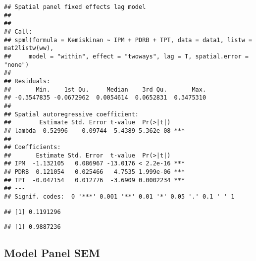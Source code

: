 \documentclass[
]{book}
\newenvironment{Shaded}{\begin{snugshade}}{\end{snugshade}}
\newcommand{\CommentTok}[1]{\textcolor[rgb]{0.56,0.35,0.01}{\textit{#1}}}
\newcommand{\DecValTok}[1]{\textcolor[rgb]{0.00,0.00,0.81}{#1}}
\newcommand{\DocumentationTok}[1]{\textcolor[rgb]{0.56,0.35,0.01}{\textbf{\textit{#1}}}}
\newcommand{\FunctionTok}[1]{\textcolor[rgb]{0.00,0.00,0.00}{#1}}
\newcommand{\NormalTok}[1]{#1}
\newcommand{\OtherTok}[1]{\textcolor[rgb]{0.56,0.35,0.01}{#1}}
\newcommand{\SpecialCharTok}[1]{\textcolor[rgb]{0.00,0.00,0.00}{#1}}
\begin{document}
\begin{verbatim}
## Spatial panel fixed effects lag model
##  
## 
## Call:
## spml(formula = Kemiskinan ~ IPM + PDRB + TPT, data = data1, listw = mat2listw(ww), 
##     model = "within", effect = "twoways", lag = T, spatial.error = "none")
## 
## Residuals:
##       Min.    1st Qu.     Median    3rd Qu.       Max. 
## -0.3547835 -0.0672962  0.0054614  0.0652831  0.3475310 
## 
## Spatial autoregressive coefficient:
##        Estimate Std. Error t-value  Pr(>|t|)    
## lambda  0.52996    0.09744  5.4389 5.362e-08 ***
## 
## Coefficients:
##       Estimate Std. Error  t-value  Pr(>|t|)    
## IPM  -1.132105   0.086967 -13.0176 < 2.2e-16 ***
## PDRB  0.121054   0.025466   4.7535 1.999e-06 ***
## TPT  -0.047154   0.012776  -3.6909 0.0002234 ***
## ---
## Signif. codes:  0 '***' 0.001 '**' 0.01 '*' 0.05 '.' 0.1 ' ' 1
\end{verbatim}

\begin{Shaded}
\end{Shaded}

\begin{verbatim}
## [1] 0.1191296
\end{verbatim}

\begin{Shaded}
\end{Shaded}

\begin{verbatim}
## [1] 0.9887236
\end{verbatim}

\hypertarget{model-panel-sem}{%
\subsection{Model Panel SEM}\label{model-panel-sem}}
\end{document}

